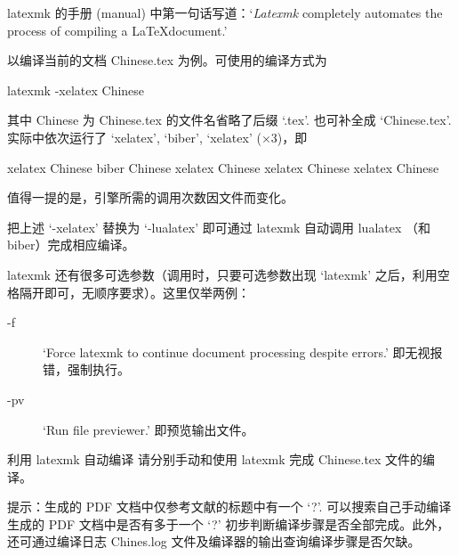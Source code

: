latexmk 的手册 (manual)\cite{latexmk} 中第一句话写道：`\emph{Latexmk} completely automates the process of compiling a \LaTeX document.'

以编译当前的文档 Chinese.tex 为例。可使用的编译方式为
\begin{bashlst}
latexmk -xelatex Chinese
\end{bashlst}
其中 Chinese 为 Chinese.tex 的文件名省略了后缀 `.tex'. 也可补全成 `Chinese.tex'. 实际中依次运行了 `xelatex', `biber', `xelatex' ($\times 3$)，即
\begin{bashlst}
xelatex Chinese
biber Chinese
xelatex Chinese
xelatex Chinese
xelatex Chinese
\end{bashlst}
值得一提的是，引擎所需的调用次数因文件而变化。

把上述 `-xelatex' 替换为 `-lualatex' 即可通过 latexmk 自动调用 lualatex （和 biber）完成相应编译。

latexmk 还有很多可选参数（调用时，只要可选参数出现 `latexmk' 之后，利用空格隔开即可，无顺序要求）。这里仅举两例：
\begin{description}
\item[-f] `Force latexmk to continue document processing despite errors.' 即无视报错，强制执行。
\item[-pv] `Run file previewer.' 即预览输出文件。
\end{description}

\begin{Ex}{利用 latexmk 自动编译}
请分别手动和使用 latexmk 完成 Chinese.tex 文件的编译。

提示：生成的 PDF 文档中仅参考文献的标题中有一个 `?'. 可以搜索自己手动编译生成的 PDF 文档中是否有多于一个 `?' 初步判断编译步骤是否全部完成。此外，还可通过编译日志 Chines.log 文件及编译器的输出查询编译步骤是否欠缺。
\end{Ex}